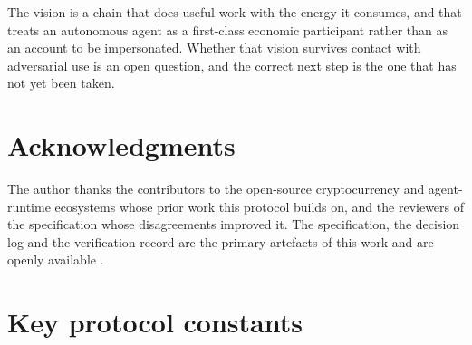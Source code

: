 \documentclass{article}
\begin{document}
The vision is a chain that does useful work with the energy it consumes, and
that treats an autonomous agent as a first-class economic participant rather
than as an account to be impersonated. Whether that vision survives contact
with adversarial use is an open question, and the correct next step is the one
that has not yet been taken.


\section*{Acknowledgments}
The author thanks the contributors to the open-source cryptocurrency and
agent-runtime ecosystems whose prior work this protocol builds on, and the
reviewers of the specification whose disagreements improved it. The
specification, the decision log and the verification record are the primary
artefacts of this work and are openly available
\cite{srct-spec,srct-decisions,srct-status,srct-readiness,srct-monetary,
srct-fuzz}.






\appendix

\section{Key protocol constants}
\label{app:constants}
\end{document}
